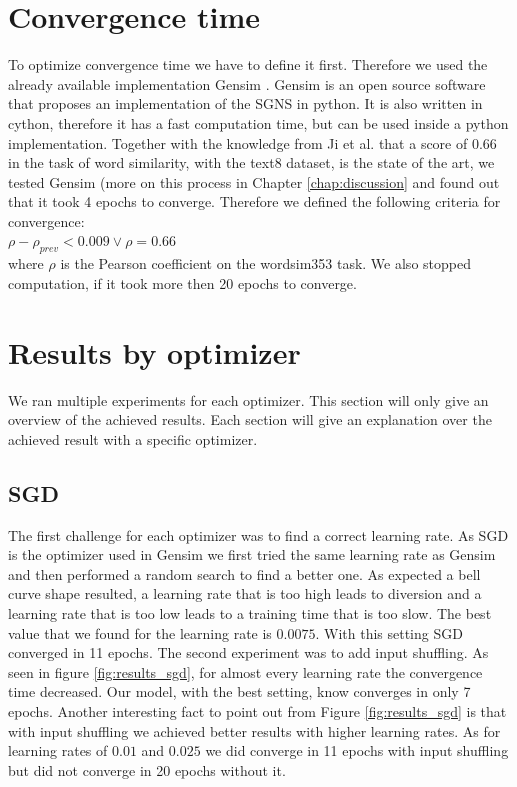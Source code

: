 \section{Convergence time} 
To optimize convergence time we have to define it first. Therefore we used the already available implementation Gensim \cite{gensim}. Gensim is an open source software that proposes an implementation of the SGNS in python. It is also written in cython, therefore it has a fast computation time, but can be used inside a python implementation. Together with the knowledge from Ji et al.\cite{intel} that a score of $0.66$ in the task of word similarity, with the text8 dataset, is the state of the art, we tested Gensim (more on this process in Chapter \ref{chap:discussion} and found out that it took 4 epochs to converge. Therefore we defined the following criteria for convergence: \\
$\rho - \rho_{prev} < 0.009 \vee \rho = 0.66$ \\
where $\rho$ is the Pearson coefficient on the wordsim353 task. 
We also stopped computation, if it took more then 20 epochs to converge. 

\section{Results by optimizer}
We ran multiple experiments for each optimizer. This section will only give an overview of the achieved results. Each section will give an explanation over the achieved result with a specific optimizer.

\subsection{SGD}
The first challenge for each optimizer was to find a correct learning rate. As SGD is the optimizer used in Gensim \cite{gensim} we first tried the same learning rate as Gensim \cite{gensim} and then performed a random search to find a better one. As expected a bell curve shape resulted, a learning rate that is too high leads to diversion and a learning rate that is too low leads to a training time that is too slow. The best value that we found for the learning rate is $0.0075$. With this setting SGD converged in 11 epochs. The second experiment was to add input shuffling. 
As seen in figure \ref{fig:results_sgd}, for almost every learning rate the convergence time decreased. Our model, with the best setting, know converges in only 7 epochs. Another interesting fact to point out from Figure \ref{fig:results_sgd} is that with input shuffling we achieved better results with higher learning rates. As for learning rates of $0.01$ and $0.025$ we did converge in 11 epochs with input shuffling but did not converge in 20 epochs without it.

